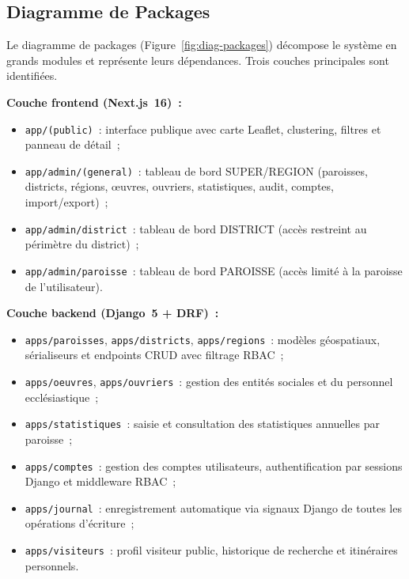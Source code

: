 \documentclass[12pt, a4paper]{report}
\begin{document}
\subsection{Diagramme de Packages}
\label{ssec:packages}

Le diagramme de packages (Figure~\ref{fig:diag-packages}) décompose le système
en grands modules et représente leurs dépendances. Trois couches principales
sont identifiées.

\noindent\textbf{Couche frontend (Next.js~16)~:}
\begin{itemize}[itemsep=2pt, topsep=3pt, leftmargin=1.5cm]
  \item \texttt{app/(public)}~: interface publique avec carte Leaflet, clustering,
    filtres et panneau de détail~;
  \item \texttt{app/admin/(general)}~: tableau de bord SUPER/REGION (paroisses,
    districts, régions, œuvres, ouvriers, statistiques, audit, comptes,
    import/export)~;
  \item \texttt{app/admin/district}~: tableau de bord DISTRICT (accès restreint
    au périmètre du district)~;
  \item \texttt{app/admin/paroisse}~: tableau de bord PAROISSE (accès limité à
    la paroisse de l'utilisateur).
\end{itemize}

\noindent\textbf{Couche backend (Django~5 + DRF)~:}
\begin{itemize}[itemsep=2pt, topsep=3pt, leftmargin=1.5cm]
  \item \texttt{apps/paroisses}, \texttt{apps/districts}, \texttt{apps/regions}~:
    modèles géospatiaux, sérialiseurs et endpoints CRUD avec filtrage RBAC~;
  \item \texttt{apps/oeuvres}, \texttt{apps/ouvriers}~: gestion des entités
    sociales et du personnel ecclésiastique~;
  \item \texttt{apps/statistiques}~: saisie et consultation des statistiques
    annuelles par paroisse~;
  \item \texttt{apps/comptes}~: gestion des comptes utilisateurs, authentification
    par sessions Django et middleware RBAC~;
  \item \texttt{apps/journal}~: enregistrement automatique via signaux Django
    de toutes les opérations d'écriture~;
  \item \texttt{apps/visiteurs}~: profil visiteur public, historique de
    recherche et itinéraires personnels.
\end{itemize}
\end{document}
